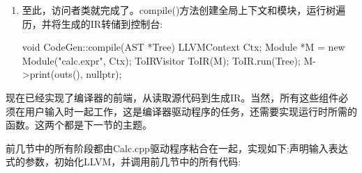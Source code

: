 \begin{enumerate}
\item
至此，访问者类就完成了。compile()方法创建全局上下文和模块，运行树遍历，并将生成的IR转储到控制台:

\begin{cpp}
void CodeGen::compile(AST *Tree) {
    LLVMContext Ctx;
    Module *M = new Module("calc.expr", Ctx);
    ToIRVisitor ToIR(M);
    ToIR.run(Tree);
    M->print(outs(), nullptr);
}
\end{cpp}

\end{enumerate}

现在已经实现了编译器的前端，从读取源代码到生成IR。当然，所有这些组件必须在用户输入时一起工作，这是编译器驱动程序的任务，还需要实现运行时所需的函数。这两个都是下一节的主题。


前几节中的所有阶段都由Calc.cpp驱动程序粘合在一起，实现如下:声明输入表达式的参数，初始化LLVM，并调用前几节中的所有代码:

